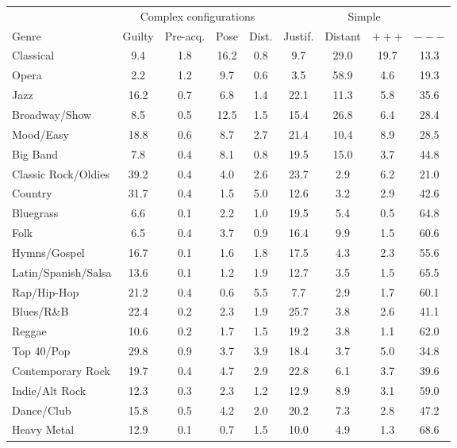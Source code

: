\begin{tabular}{lcccccccc}
\toprule
 & \multicolumn{4}{c}{Complex configurations} & \multicolumn{4}{c}{Simple} \\
\cmidrule(lr){2-5}\cmidrule(lr){6-9}
Genre & Guilty & Pre-acq. & Pose & Dist. & Justif. & Distant & $+++$ & $---$ \\
\midrule
Classical & 9.4 & 1.8 & 16.2 & 0.8 & 9.7 & 29.0 & 19.7 & 13.3 \\
Opera & 2.2 & 1.2 & 9.7 & 0.6 & 3.5 & 58.9 & 4.6 & 19.3 \\
Jazz & 16.2 & 0.7 & 6.8 & 1.4 & 22.1 & 11.3 & 5.8 & 35.6 \\
Broadway/Show & 8.5 & 0.5 & 12.5 & 1.5 & 15.4 & 26.8 & 6.4 & 28.4 \\
Mood/Easy & 18.8 & 0.6 & 8.7 & 2.7 & 21.4 & 10.4 & 8.9 & 28.5 \\
Big Band & 7.8 & 0.4 & 8.1 & 0.8 & 19.5 & 15.0 & 3.7 & 44.8 \\
Classic Rock/Oldies & 39.2 & 0.4 & 4.0 & 2.6 & 23.7 & 2.9 & 6.2 & 21.0 \\
Country & 31.7 & 0.4 & 1.5 & 5.0 & 12.6 & 3.2 & 2.9 & 42.6 \\
Bluegrass & 6.6 & 0.1 & 2.2 & 1.0 & 19.5 & 5.4 & 0.5 & 64.8 \\
Folk & 6.5 & 0.4 & 3.7 & 0.9 & 16.4 & 9.9 & 1.5 & 60.6 \\
Hymns/Gospel & 16.7 & 0.1 & 1.6 & 1.8 & 17.5 & 4.3 & 2.3 & 55.6 \\
Latin/Spanish/Salsa & 13.6 & 0.1 & 1.2 & 1.9 & 12.7 & 3.5 & 1.5 & 65.5 \\
Rap/Hip-Hop & 21.2 & 0.4 & 0.6 & 5.5 & 7.7 & 2.9 & 1.7 & 60.1 \\
Blues/R\&B & 22.4 & 0.2 & 2.3 & 1.9 & 25.7 & 3.8 & 2.6 & 41.1 \\
Reggae & 10.6 & 0.2 & 1.7 & 1.5 & 19.2 & 3.8 & 1.1 & 62.0 \\
Top 40/Pop & 29.8 & 0.9 & 3.7 & 3.9 & 18.4 & 3.7 & 5.0 & 34.8 \\
Contemporary Rock & 19.7 & 0.4 & 4.7 & 2.9 & 22.8 & 6.1 & 3.7 & 39.6 \\
Indie/Alt Rock & 12.3 & 0.3 & 2.3 & 1.2 & 12.9 & 8.9 & 3.1 & 59.0 \\
Dance/Club & 15.8 & 0.5 & 4.2 & 2.0 & 20.2 & 7.3 & 2.8 & 47.2 \\
Heavy Metal & 12.9 & 0.1 & 0.7 & 1.5 & 10.0 & 4.9 & 1.3 & 68.6 \\
\bottomrule
\end{tabular}
